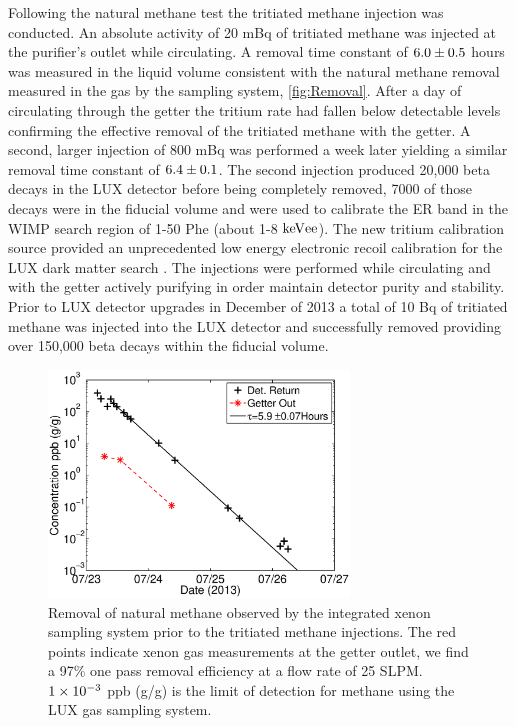 Following the natural methane test the tritiated methane injection was conducted. An absolute activity of 20 mBq of tritiated methane was injected at the purifier's outlet while circulating. A removal time constant of $\rm 6.0 \pm 0.5$ hours was measured in the liquid volume consistent with the natural methane removal measured in the gas by the sampling system, \ref{fig:Removal}. After a day of circulating through the getter the tritium rate had fallen below detectable levels confirming the effective removal of the tritiated methane with the getter. A second, larger injection of 800 mBq was performed a week later yielding a similar removal time constant of $\rm 6.4 \pm 0.1$. The second injection produced 20,000 beta decays in the LUX detector before being completely removed, 7000 of those decays were in the fiducial volume and were used to calibrate the ER band in the WIMP search region of 1-50 Phe (about 1-8 $\rm keV{ee}$). The new tritium calibration source provided an unprecedented low energy electronic recoil calibration for the LUX dark matter search \cite{LUX_PRL}. The injections were performed while circulating and with the getter actively purifying in order maintain detector purity and stability. Prior to LUX detector upgrades in December of 2013 a total of 10 Bq of tritiated methane was injected into the LUX detector and successfully removed providing over 150,000 beta decays within the fiducial volume. 


\begin{figure}[h!]\centering
\includegraphics[width=80mm]{CH4_injection_3.eps}
\caption{Removal of natural methane observed by the integrated xenon sampling system prior to the tritiated methane injections. The red points indicate xenon gas measurements at the getter outlet, we find a 97\% one pass removal efficiency at a flow rate of 25 SLPM. $\rm 1\times10^{-3}$ ppb (g/g) is the limit of detection for methane using the LUX gas sampling system.}
\label{fig:Removal_methane}
\end{figure}


